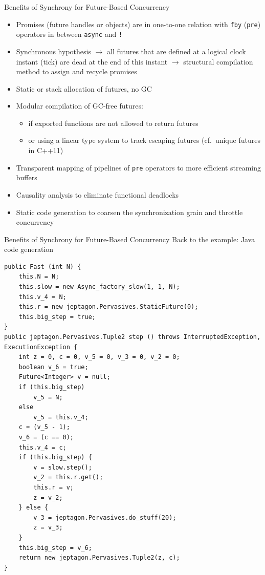 \documentclass[xcolor=dvipsnames,9pt,mathserif]{beamer}
\begin{document}
\begin{frame}{Benefits of Synchrony for Future-Based Concurrency}
  \begin{itemize}
  \item Promises (future handles or objects) are in one-to-one relation with
    \texttt{fby} (\texttt{pre}) operators in between \texttt{async}
    and \texttt{!}
  \item Synchronous hypothesis $\to$ all futures that are defined at a
    logical clock instant (tick) are dead at the end of this instant
    $\to$ structural compilation method to assign and recycle promises
  \item Static or stack allocation of futures, no GC
  \item Modular compilation of GC-free futures:
    \begin{itemize}
    \item if exported functions are not allowed to return futures
    \item or using a linear type system to track escaping futures
      (cf.\ unique futures in C++11)
    \end{itemize}
  \item Transparent mapping of pipelines of \texttt{pre} operators to
    more efficient streaming buffers
  \item Causality analysis to eliminate functional deadlocks
  \item Static code generation to coarsen the synchronization grain
    and throttle concurrency
  \end{itemize}
\end{frame}

\begin{frame}[fragile]{Benefits of Synchrony for Future-Based Concurrency}
  Back to the example: Java code generation

  \tiny
  \begin{lstlisting}
public Fast (int N) {
    this.N = N;
    this.slow = new Async_factory_slow(1, 1, N);
    this.v_4 = N;
    this.r = new jeptagon.Pervasives.StaticFuture(0);
    this.big_step = true;
}
public jeptagon.Pervasives.Tuple2 step () throws InterruptedException, ExecutionException {
    int z = 0, c = 0, v_5 = 0, v_3 = 0, v_2 = 0;
    boolean v_6 = true;
    Future<Integer> v = null;
    if (this.big_step)
        v_5 = N;
    else
        v_5 = this.v_4;
    c = (v_5 - 1);
    v_6 = (c == 0);
    this.v_4 = c;
    if (this.big_step) {
        v = slow.step();
        v_2 = this.r.get();
        this.r = v;
        z = v_2;
    } else {
        v_3 = jeptagon.Pervasives.do_stuff(20);
        z = v_3;
    }
    this.big_step = v_6;
    return new jeptagon.Pervasives.Tuple2(z, c);
}
  \end{lstlisting}
\end{frame}
\end{document}
